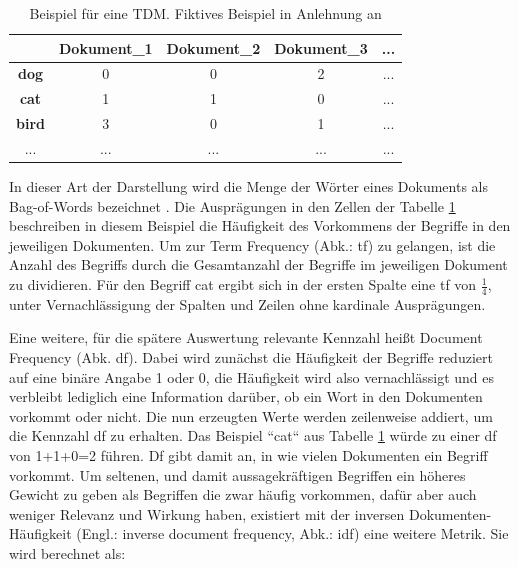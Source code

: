 \begin{table}[h]
\centering
\begin{tabular}{|c|c|c|c|c|}
\hline
\textbf{}     & \textbf{Dokument\_1} & \textbf{Dokument\_2} & \textbf{Dokument\_3} & \textbf{...} \\ \hline
\textbf{dog}  & 0                    & 0                    & 2                    & ...          \\ \hline
\textbf{cat}  & 1                    & 1                    & 0                    & ...          \\ \hline
\textbf{bird} & 3                    & 0                    & 1                    & ...          \\ \hline
...           & ...                  & ...                  & ...                  & ...          \\ \hline
\end{tabular}
\caption{Beispiel für eine TDM. Fiktives Beispiel in Anlehnung an \cite[S. 62]{Anandarajan}}
\label{tab:tdm}
\end{table}

In dieser Art der Darstellung wird die Menge der Wörter eines Dokuments als Bag-of-Words bezeichnet \cite[S. 46]{Anandarajan}. Die Ausprägungen in den Zellen der Tabelle \ref{tab:tdm} beschreiben in diesem Beispiel die Häufigkeit des Vorkommens der Begriffe in den jeweiligen Dokumenten. Um zur Term Frequency (Abk.: tf) zu gelangen, ist die Anzahl des Begriffs durch die Gesamtanzahl der Begriffe im jeweiligen Dokument zu dividieren. Für den Begriff cat ergibt sich in der ersten Spalte eine tf von \( \frac{1}{4} \), unter Vernachlässigung der Spalten und Zeilen ohne kardinale Ausprägungen.

Eine weitere, für die spätere Auswertung relevante Kennzahl heißt Document Frequency (Abk. df). Dabei wird zunächst die Häufigkeit der Begriffe reduziert auf eine binäre Angabe 1 oder 0, die Häufigkeit wird also vernachlässigt und es verbleibt lediglich eine Information darüber, ob ein Wort in den Dokumenten vorkommt oder nicht. Die nun erzeugten Werte werden zeilenweise addiert, um die Kennzahl df zu erhalten. Das Beispiel ``cat`` aus Tabelle \ref{tab:tdm} würde zu einer df von 1+1+0=2 führen. Df gibt damit an, in wie vielen Dokumenten ein Begriff vorkommt. Um seltenen, und damit aussagekräftigen Begriffen ein höheres Gewicht zu geben als Begriffen die zwar häufig vorkommen, dafür aber auch weniger Relevanz und Wirkung haben, existiert mit der inversen Dokumenten-Häufigkeit (Engl.: inverse document frequency, Abk.: idf) eine weitere Metrik. Sie wird berechnet als:

